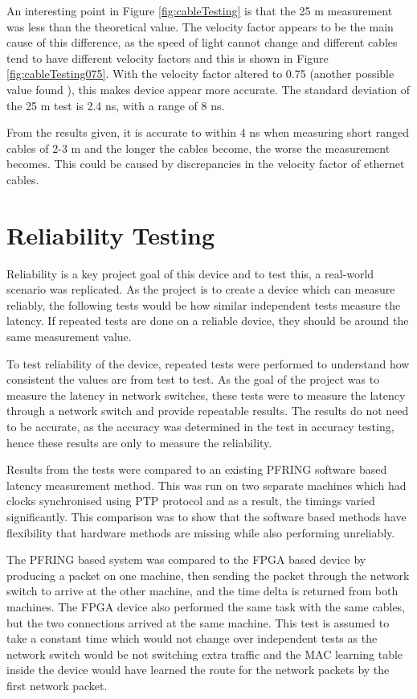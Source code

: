 An interesting point in Figure \ref{fig:cableTesting} is that the 25 m measurement was less than the theoretical 
value. The velocity factor appears to be the main cause of this difference, as the speed of light cannot change and 
different cables tend to have different velocity factors and this is shown in Figure \ref{fig:cableTesting075}. With 
the velocity factor altered to 0.75 (another possible value found \cite{VelFactor075}), this makes device appear more accurate. The standard deviation of the 25 m test 
is 2.4 ns, with a range of 8 ns.

From the results given, it is accurate to within 4 ns when measuring short ranged cables of 2-3 m and the longer the 
cables become, the worse the measurement becomes. This could be caused by discrepancies in the velocity factor of 
ethernet cables.

\section{Reliability Testing}

Reliability is a key project goal of this device and to test this, a real-world scenario was replicated. As the 
project is to create a device which can measure reliably, the following tests would be how similar independent tests 
measure the latency. If repeated tests are done on a reliable device, they should be around the same measurement 
value.

To test reliability of the device, repeated tests were performed to understand how consistent the values are from 
test to test. As the goal of the project was to measure the latency in network switches, these tests were to measure 
the latency through a network switch and provide repeatable results. The results do not need to be accurate, as the 
accuracy was determined in the test in accuracy testing, hence these results are only to measure the reliability. 

Results from the tests were compared to an existing PF\textunderscore RING software based latency measurement method.
This was run on two separate machines which had clocks synchronised using PTP protocol and as a result, the timings 
varied significantly. This comparison was to show that the software based methods have flexibility that hardware 
methods are missing while also performing unreliably. 

The PF\textunderscore RING based system was compared to the FPGA based device by producing a packet on one machine, 
then sending the packet through the network switch to arrive at the other machine, and the time delta is returned 
from both machines. The FPGA device also performed the same task with the same cables, but the two connections 
arrived at the same machine. This test is assumed to take a constant time which would not change over independent 
tests as the network switch would be not switching extra traffic and the MAC learning table inside the device would 
have learned the route for the network packets by the first network packet. 


